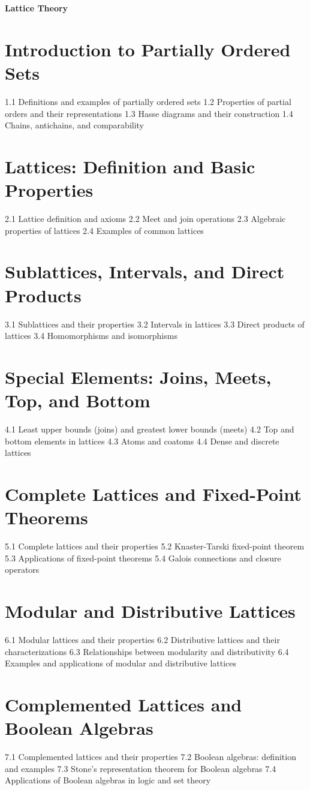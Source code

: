 {\LARGE \bf{Lattice Theory}}
\section{Introduction to Partially Ordered Sets}
1.1 Definitions and examples of partially ordered sets
1.2 Properties of partial orders and their representations
1.3 Hasse diagrams and their construction
1.4 Chains, antichains, and comparability
\section{Lattices: Definition and Basic Properties}
2.1 Lattice definition and axioms
2.2 Meet and join operations
2.3 Algebraic properties of lattices
2.4 Examples of common lattices
\section{Sublattices, Intervals, and Direct Products}
3.1 Sublattices and their properties
3.2 Intervals in lattices
3.3 Direct products of lattices
3.4 Homomorphisms and isomorphisms
\section{Special Elements: Joins, Meets, Top, and Bottom}
4.1 Least upper bounds (joins) and greatest lower bounds (meets)
4.2 Top and bottom elements in lattices
4.3 Atoms and coatoms
4.4 Dense and discrete lattices
\section{Complete Lattices and Fixed-Point Theorems}
5.1 Complete lattices and their properties
5.2 Knaster-Tarski fixed-point theorem
5.3 Applications of fixed-point theorems
5.4 Galois connections and closure operators
\section{Modular and Distributive Lattices}
6.1 Modular lattices and their properties
6.2 Distributive lattices and their characterizations
6.3 Relationships between modularity and distributivity
6.4 Examples and applications of modular and distributive lattices
\section{Complemented Lattices and Boolean Algebras}
7.1 Complemented lattices and their properties
7.2 Boolean algebras: definition and examples
7.3 Stone's representation theorem for Boolean algebras
7.4 Applications of Boolean algebras in logic and set theory
